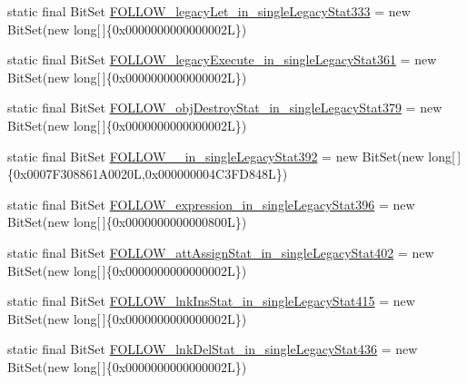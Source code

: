 \begin{DoxyCompactItemize}
\item 
static final Bit\-Set \hyperlink{classorg_1_1tzi_1_1use_1_1parser_1_1shell_1_1_shell_command_parser_a5ef57891362452dd4c8882ae2761616b}{F\-O\-L\-L\-O\-W\-\_\-legacy\-Let\-\_\-in\-\_\-single\-Legacy\-Stat333} = new Bit\-Set(new long\mbox{[}$\,$\mbox{]}\{0x0000000000000002\-L\})
\item 
static final Bit\-Set \hyperlink{classorg_1_1tzi_1_1use_1_1parser_1_1shell_1_1_shell_command_parser_afa244a2a017e28ee192db92a52a35832}{F\-O\-L\-L\-O\-W\-\_\-legacy\-Execute\-\_\-in\-\_\-single\-Legacy\-Stat361} = new Bit\-Set(new long\mbox{[}$\,$\mbox{]}\{0x0000000000000002\-L\})
\item 
static final Bit\-Set \hyperlink{classorg_1_1tzi_1_1use_1_1parser_1_1shell_1_1_shell_command_parser_a3859a1c068aed08c0b7a82af31a8b411}{F\-O\-L\-L\-O\-W\-\_\-obj\-Destroy\-Stat\-\_\-in\-\_\-single\-Legacy\-Stat379} = new Bit\-Set(new long\mbox{[}$\,$\mbox{]}\{0x0000000000000002\-L\})
\item 
static final Bit\-Set \hyperlink{classorg_1_1tzi_1_1use_1_1parser_1_1shell_1_1_shell_command_parser_a59888a9f84b1a9d0bb2020618df591e5}{F\-O\-L\-L\-O\-W\-\_\-\_\-in\-\_\-single\-Legacy\-Stat392} = new Bit\-Set(new long\mbox{[}$\,$\mbox{]}\{0x0007\-F308861\-A0020\-L,0x000000004\-C3\-F\-D848\-L\})
\item 
static final Bit\-Set \hyperlink{classorg_1_1tzi_1_1use_1_1parser_1_1shell_1_1_shell_command_parser_a3502bd65d74c2f9309fb180558f45a48}{F\-O\-L\-L\-O\-W\-\_\-expression\-\_\-in\-\_\-single\-Legacy\-Stat396} = new Bit\-Set(new long\mbox{[}$\,$\mbox{]}\{0x0000000000000800\-L\})
\item 
static final Bit\-Set \hyperlink{classorg_1_1tzi_1_1use_1_1parser_1_1shell_1_1_shell_command_parser_a37e94ae80c9180ef7d50cdaee6974375}{F\-O\-L\-L\-O\-W\-\_\-att\-Assign\-Stat\-\_\-in\-\_\-single\-Legacy\-Stat402} = new Bit\-Set(new long\mbox{[}$\,$\mbox{]}\{0x0000000000000002\-L\})
\item 
static final Bit\-Set \hyperlink{classorg_1_1tzi_1_1use_1_1parser_1_1shell_1_1_shell_command_parser_ac8fb4a3af8c2d0fbda4c75864ad9af09}{F\-O\-L\-L\-O\-W\-\_\-lnk\-Ins\-Stat\-\_\-in\-\_\-single\-Legacy\-Stat415} = new Bit\-Set(new long\mbox{[}$\,$\mbox{]}\{0x0000000000000002\-L\})
\item 
static final Bit\-Set \hyperlink{classorg_1_1tzi_1_1use_1_1parser_1_1shell_1_1_shell_command_parser_ae7bb0e1a3766e184b3d2b3b887432423}{F\-O\-L\-L\-O\-W\-\_\-lnk\-Del\-Stat\-\_\-in\-\_\-single\-Legacy\-Stat436} = new Bit\-Set(new long\mbox{[}$\,$\mbox{]}\{0x0000000000000002\-L\})

\end{DoxyCompactItemize}
